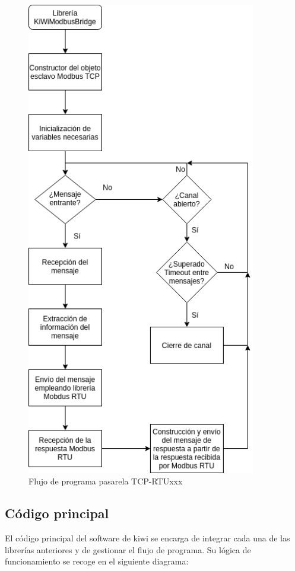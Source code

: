 \begin{figure}[H]
  \centering
  \includegraphics[width=10cm, keepaspectratio]{img/flujoLibreriaPuente}
  \caption{Flujo de programa pasarela TCP-RTUxxx}
  \label{figura:flujoLibreriaPuente}
\end{figure}

\subsection{Código principal}
\label{subsec:mainCodeKiwi}

El código principal del software de kiwi se encarga de integrar cada una de las librerías anteriores y de gestionar el flujo de programa. Su lógica de funcionamiento se recoge en el siguiente diagrama:

